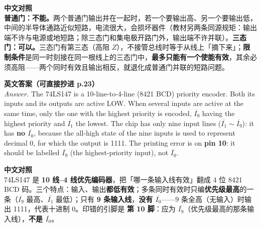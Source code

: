 \documentclass[11pt]{ctexart}
\let\origsubhdr\subhdr
\renewcommand{\subhdr}[1]{\needspace{3\baselineskip}\origsubhdr{#1}}
\begin{document}
\textbf{中文对照}\\
\textbf{普通门：不能。}两个普通门输出并在一起时，若一个要输出高、另一个要输出低，中间的半导体通路近似短路，电流很大，会损坏器件（教材另两条同源规矩：输出端不许与电源或地短路；除三态门和集电极开路门外，输出端不许并联）。\textbf{三态门：可以。}三态门有第三态（高阻 $Z$），不接管总线时等于从线上「摘下来」；\textbf{限制条件}是同一时刻接在同一根线上的三态门中，\textbf{最多只能有一个使能有效}，其余必须高阻——两个同时有效且输出相反，就退化成普通门并联的短路问题。



\textbf{英文答案（可直接抄进 p.23）}\\
\emph{Answer.} The 74LS147 is a 10-line-to-4-line (8421 BCD) priority encoder. Both its inputs and its outputs are active LOW. When several inputs are active at the same time, only the one with the highest priority is encoded, $\overline{I_9}$ having the highest priority and $\overline{I_1}$ the lowest. The chip has only nine input lines ($\overline{I_1}\sim\overline{I_9}$): it has \textbf{no $\overline{I_0}$}, because the all-high state of the nine inputs is used to represent decimal 0, for which the output is 1111. The printing error is on \textbf{pin 10}: it should be labelled $\overline{I_9}$ (the highest-priority input), not $\overline{I_0}$.

\textbf{中文对照}\\
74LS147 是 \textbf{10 线--4 线优先编码器}，把「哪一条输入线有效」翻成 4 位 8421 BCD 码。三个特点：输入、输出\textbf{都低有效}；多条同时有效时只编\textbf{优先级最高}的一条（$\overline{I_9}$ 最高、$\overline{I_1}$ 最低）；只有 \textbf{9 条输入线}，\textbf{没有 $\overline{I_0}$}——9 条全高（无输入）时输出 1111，代表十进制 0。印错的引脚是 \textbf{第 10 脚}：应为 $\overline{I_9}$（优先级最高的那条输入线），\textbf{不是 $\overline{I_0}$}。
\end{document}
